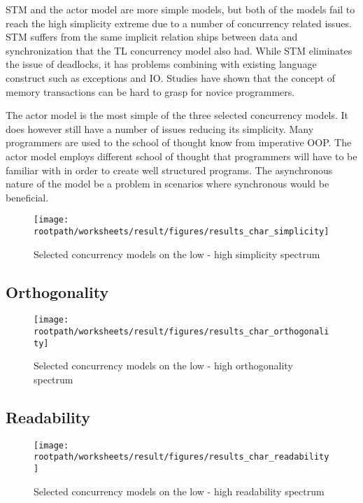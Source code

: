 \ac{STM} and the actor model are more simple models, but both of the models fail to reach the high simplicity extreme due to a number of concurrency related issues. \ac{STM} suffers from the same implicit relation ships between data and synchronization that the \ac{TL} concurrency model also had. While \ac{STM} eliminates the issue of deadlocks, it has problems combining with existing language construct such as exceptions and \ac{IO}. Studies have shown that the concept of memory transactions can be hard to grasp for novice programmers.

The actor model is the most simple of the three selected concurrency models. It does however still have a number of issues reducing its simplicity. Many programmers are used to the school of thought know from imperative \ac{OOP}. The actor model employs different school of thought that programmers will have to be familiar with in order to create well structured programs. The asynchronous nature of the model be a problem in scenarios where synchronous would be beneficial.

\begin{figure}[htbp]
\centering
 \texttt{[image: \\rootpath/worksheets/result/figures/results\_char\_simplicity]} 
 \caption{Selected concurrency models on the low - high simplicity spectrum}
\label{fig:results_char_simplicity}
\end{figure}

\subsection{Orthogonality}


\begin{figure}[htbp]
\centering
 \texttt{[image: \\rootpath/worksheets/result/figures/results\_char\_orthogonality]} 
 \caption{Selected concurrency models on the low - high orthogonality spectrum}
\label{fig:results_char_orthogonality}
\end{figure}

\subsection{Readability}

\begin{figure}[htbp]
\centering
 \texttt{[image: \\rootpath/worksheets/result/figures/results\_char\_readability]} 
 \caption{Selected concurrency models on the low - high readability spectrum}
\label{fig:results_char_readability}
\end{figure}

